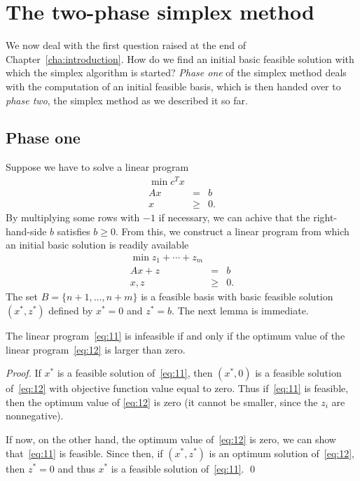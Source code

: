\chapter{The two-phase simplex method}
\label{cha:two-phase-simplex}

We now deal with the first question raised at the end of
Chapter~\ref{cha:introduction}. How do we find an initial basic
feasible solution with which the simplex algorithm is started? \emph{Phase
one} of the simplex method deals with the computation of an initial
feasible basis, which is then handed over to \emph{phase two}, the simplex
method as we described it so far. 

\section{Phase one}
\label{sec:phase-1}

Suppose we have to solve a linear program 
\begin{equation}
  \label{eq:11}
  \begin{array}{rcl}
    \min c^Tx \\
    A x & = & b \\
    x & \geq& 0.
  \end{array}
\end{equation}
By multiplying some rows with $-1$ if necessary, we can achive that
the right-hand-side $b$ satisfies $b\geq0$. From this, we construct a
linear program from which an initial basic solution is readily
available
\begin{equation}
  \label{eq:12}
  \begin{array}{rcl}
    \min z_1+ \cdots+ z_m \\
    A x +z & = & b \\
    x,z & \geq& 0.
  \end{array}
\end{equation}
The set $B = \{n+1,\ldots,n+m\}$ is a feasible basis with basic feasible
solution $(x^*,z^*)$ defined by $x^* = 0$  and $z^* = b$. The next
lemma is immediate. 
\begin{lemma}
  \label{lem:4}
  The linear program~\eqref{eq:11} is infeasible if and only if the
  optimum value of the linear program~\eqref{eq:12} is larger than
  zero. 
\end{lemma}
\begin{proof}
  If $x^*$ is a feasible solution of~\eqref{eq:11}, then $(x^*,0)$ is
  a feasible solution of~\eqref{eq:12} with objective function value
  equal to zero. Thus if~\eqref{eq:11} is feasible, then the optimum
  value of \eqref{eq:12} is  zero (it cannot be smaller, since the
  $z_i$ are nonnegative).  

  If now, on the other hand, the optimum value of~\eqref{eq:12} is
  zero, we can show that~\eqref{eq:11} is feasible. Since then, if
  $(x^*,z^*)$ is an optimum solution of~\eqref{eq:12}, then $z^* = 0$
  and thus $x^*$ is a feasible solution of~\eqref{eq:11}. \qed
\end{proof}


